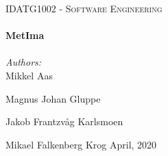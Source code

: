 
\begin{titlepage}
\vbox{ }

\vbox{ }

\begin{center}
\textsc{\Large IDATG1002 - Software Engineering}\\[0.5cm]

\vbox{ }
\HRule \\[0.4cm]
{ \huge \bfseries MetIma}\\[0.4cm]
\HRule \\[1.5cm]
\large
\emph{Authors:}\\

Mikkel Aas

Magnus Johan Gluppe

Jakob Frantzvåg Karlsmoen

Mikael Falkenberg Krog
\vfill
{\large April, 2020}
\end{center}
\end{titlepage}